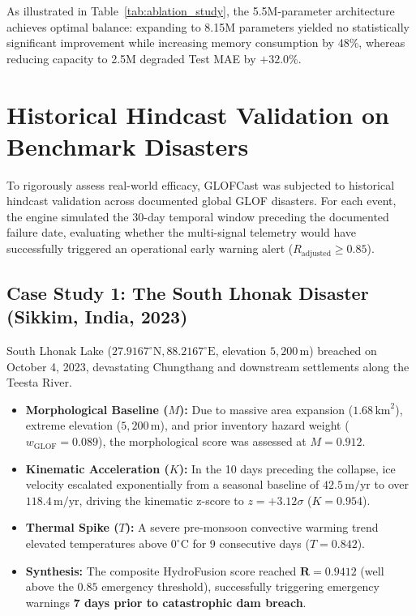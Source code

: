 \documentclass{mnnit}
\begin{document}
As illustrated in Table~\ref{tab:ablation_study}, the 5.5M-parameter architecture achieves optimal balance: expanding to 8.15M parameters yielded no statistically significant improvement while increasing memory consumption by 48\%, whereas reducing capacity to 2.5M degraded Test MAE by $+32.0\%$.

\section{Historical Hindcast Validation on Benchmark Disasters}
To rigorously assess real-world efficacy, GLOFCast was subjected to historical hindcast validation across documented global GLOF disasters. For each event, the engine simulated the 30-day temporal window preceding the documented failure date, evaluating whether the multi-signal telemetry would have successfully triggered an operational early warning alert ($R_{\text{adjusted}} \ge 0.85$).

\subsection{Case Study 1: The South Lhonak Disaster (Sikkim, India, 2023)}
South Lhonak Lake ($27.9167^\circ\text{N}, 88.2167^\circ\text{E}$, elevation $5,200\,\text{m}$) breached on October 4, 2023, devastating Chungthang and downstream settlements along the Teesta River. 
\begin{itemize}
    \item \textbf{Morphological Baseline ($M$):} Due to massive area expansion ($1.68\,\text{km}^2$), extreme elevation ($5,200\,\text{m}$), and prior inventory hazard weight ($w_{\text{GLOF}} = 0.089$), the morphological score was assessed at $M = 0.912$.
    \item \textbf{Kinematic Acceleration ($K$):} In the 10 days preceding the collapse, ice velocity escalated exponentially from a seasonal baseline of $42.5\,\text{m/yr}$ to over $118.4\,\text{m/yr}$, driving the kinematic z-score to $z = +3.12\sigma$ ($K = 0.954$).
    \item \textbf{Thermal Spike ($T$):} A severe pre-monsoon convective warming trend elevated temperatures above $0^\circ\text{C}$ for 9 consecutive days ($T = 0.842$).
    \item \textbf{Synthesis:} The composite HydroFusion score reached $\mathbf{R = 0.9412}$ (well above the $0.85$ emergency threshold), successfully triggering emergency warnings \textbf{7 days prior to catastrophic dam breach}.
\end{itemize}
\end{document}
